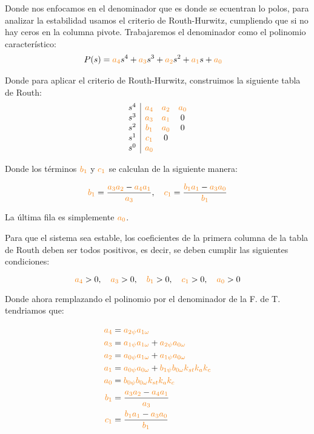 Donde nos enfocamos en el denominador que es donde se ecuentran lo polos, para analizar la estabilidad usamos el criterio de Routh-Hurwitz, cumpliendo que si no hay ceros en la columna pivote. Trabajaremos el denominador como el polinomio característico:
\begin{align}
    P(s) = \nara{a_4} s^4 + \nara{a_3} s^3 + \nara{a_2} s^2 + \nara{a_1} s + \nara{a_0} &
\end{align}

Donde para aplicar el criterio de Routh-Hurwitz, construimos la siguiente tabla de Routh:
\[
\begin{array}{c|ccc}
s^4 & \nara{a_4} & \nara{a_2} & \nara{a_0} \\
s^3 & \nara{a_3} & \nara{a_1} & 0\\
s^2 & \nara{b_1} & \nara{a_0} & 0\\
s^1 & \nara{c_1} & 0 \\
s^0 & \nara{a_0} & 
\end{array}
\]



Donde los términos \(\nara{b_1}\) y \(\nara{c_1}\) se calculan de la siguiente manera:

\[
\nara{b_1} = \frac{\nara{a_3 a_2} - \nara{a_4 a_1}}{\nara{a_3}}, \quad \nara{c_1} = \frac{\nara{b_1 a_1} - \nara{a_3 a_0}}{\nara{b_1}}
\]

La última fila es simplemente \(\nara{a_0}\).

Para que el sistema sea estable, los coeficientes de la primera columna de la tabla de Routh deben ser todos positivos, es decir, se deben cumplir las siguientes condiciones:

\[
\nara{a_4} > 0, \quad \nara{a_3} > 0, \quad \nara{b_1} > 0, \quad \nara{c_1} > 0, \quad \nara{a_0} > 0
\]


Donde ahora remplazando el polinomio por el denominador de la F. de T. tendriamos que:


\begin{align*}
  \nara{a_4} &= \nara{a_{2\psi} a_{1\omega}} \\
  \nara{a_3} &= \nara{a_{1\psi} a_{1\omega}} + \nara{a_{2\psi} a_{0\omega}} \\
  \nara{a_2} &= \nara{a_{0\psi} a_{1\omega}} + \nara{a_{1\psi} a_{0\omega}} \\
  \nara{a_1} &= \nara{a_{0\psi} a_{0\omega}} + \nara{b_{1\psi} b_{0\omega} k_{st} k_a k_c} \\
  \nara{a_0} &= \nara{b_{0\psi} b_{0\omega} k_{st} k_a k_c} \\
  \nara{b_1} &= \frac{\nara{a_3 a_2} - \nara{a_4 a_1}}{\nara{a_3}} \\
  \nara{c_1} &= \frac{\nara{b_1 a_1} - \nara{a_3 a_0}}{\nara{b_1}}
  \end{align*}


